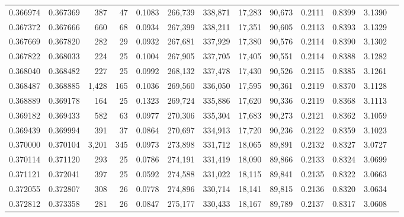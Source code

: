 \begin{tabular}{rrrrrrrrrrrrr}
0.366974 & 0.367369 &   387 &  47 &                                     0.1083 & 266,739 & 338,871 &  17,283 &  90,673 & 0.2111 & 0.8399 & 3.1390 \\
0.367372 & 0.367666 &   660 &  68 &                                     0.0934 & 267,399 & 338,211 &  17,351 &  90,605 & 0.2113 & 0.8393 & 3.1329 \\
0.367669 & 0.367820 &   282 &  29 &                                     0.0932 & 267,681 & 337,929 &  17,380 &  90,576 & 0.2114 & 0.8390 & 3.1302 \\
0.367822 & 0.368033 &   224 &  25 &                                     0.1004 & 267,905 & 337,705 &  17,405 &  90,551 & 0.2114 & 0.8388 & 3.1282 \\
0.368040 & 0.368482 &   227 &  25 &                                     0.0992 & 268,132 & 337,478 &  17,430 &  90,526 & 0.2115 & 0.8385 & 3.1261 \\
0.368487 & 0.368885 & 1,428 & 165 &                                     0.1036 & 269,560 & 336,050 &  17,595 &  90,361 & 0.2119 & 0.8370 & 3.1128 \\
0.368889 & 0.369178 &   164 &  25 &                                     0.1323 & 269,724 & 335,886 &  17,620 &  90,336 & 0.2119 & 0.8368 & 3.1113 \\
0.369182 & 0.369433 &   582 &  63 &                                     0.0977 & 270,306 & 335,304 &  17,683 &  90,273 & 0.2121 & 0.8362 & 3.1059 \\
0.369439 & 0.369994 &   391 &  37 &                                     0.0864 & 270,697 & 334,913 &  17,720 &  90,236 & 0.2122 & 0.8359 & 3.1023 \\
0.370000 & 0.370104 & 3,201 & 345 &                                     0.0973 & 273,898 & 331,712 &  18,065 &  89,891 & 0.2132 & 0.8327 & 3.0727 \\
0.370114 & 0.371120 &   293 &  25 &                                     0.0786 & 274,191 & 331,419 &  18,090 &  89,866 & 0.2133 & 0.8324 & 3.0699 \\
0.371121 & 0.372041 &   397 &  25 &                                     0.0592 & 274,588 & 331,022 &  18,115 &  89,841 & 0.2135 & 0.8322 & 3.0663 \\
0.372055 & 0.372807 &   308 &  26 &                                     0.0778 & 274,896 & 330,714 &  18,141 &  89,815 & 0.2136 & 0.8320 & 3.0634 \\
0.372812 & 0.373358 &   281 &  26 &                                     0.0847 & 275,177 & 330,433 &  18,167 &  89,789 & 0.2137 & 0.8317 & 3.0608 \\

\end{tabular}
